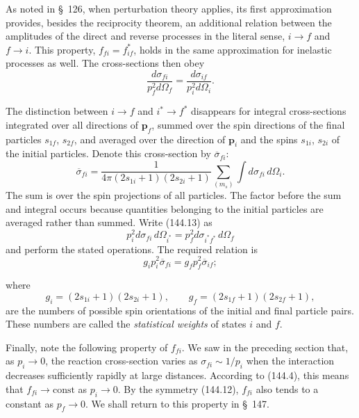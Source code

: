 As noted in \S~126, when perturbation theory applies, its first approximation
provides, besides the reciprocity theorem, an additional relation between the
amplitudes of the direct and reverse processes in the literal sense,
$i\to f$ and $f\to i$. This property, $f_{fi}=f_{if}^*$, holds in the same
approximation for inelastic processes as well. The cross-sections then obey
\begin{equation}
 \frac{d\sigma_{fi}}{p_f^2d\Omega_f}
 =\frac{d\sigma_{if}}{p_i^2d\Omega_i}.
 \tag{144.14}
\end{equation}

The distinction between $i\to f$ and $i^*\to f^*$ disappears for integral
cross-sections integrated over all directions of $\mathbf p_f$, summed over
the spin directions of the final particles $s_{1f}$, $s_{2f}$, and averaged
over the direction of $\mathbf p_i$ and the spins $s_{1i}$, $s_{2i}$ of the
initial particles. Denote this cross-section by $\overline{\sigma}_{fi}$:
\[
 \overline{\sigma}_{fi}=\frac1{4\pi(2s_{1i}+1)(2s_{2i}+1)}
 \sum_{(m_s)}\int d\sigma_{fi}\,d\Omega_i.
\]
The sum is over the spin projections of all particles. The factor before the
sum and integral occurs because quantities belonging to the initial particles
are averaged rather than summed. Write (144.13) as
\[
 p_i^2d\sigma_{fi}\,d\Omega_{i^*}
 =p_f^2d\sigma_{i^*f^*}\,d\Omega_f
\]
and perform the stated operations. The required relation is
\begin{equation}
 g_ip_i^2\overline{\sigma}_{fi}=g_fp_f^2\overline{\sigma}_{if};
 \tag{144.15}
\end{equation}

where
\begin{equation}
 g_i=(2s_{1i}+1)(2s_{2i}+1),\qquad
 g_f=(2s_{1f}+1)(2s_{2f}+1),
 \tag{144.16}
\end{equation}
are the numbers of possible spin orientations of the initial and final
particle pairs. These numbers are called the \emph{statistical weights} of
states $i$ and $f$.

Finally, note the following property of $f_{fi}$. We saw in the preceding
section that, as $p_i\to0$, the reaction cross-section varies as
$\sigma_{fi}\sim1/p_i$ when the interaction decreases sufficiently rapidly
at large distances. According to (144.4), this means that
$f_{fi}\to\mathrm{const}$ as $p_i\to0$. By the symmetry (144.12), $f_{fi}$
also tends to a constant as $p_f\to0$. We shall return to this property in
\S~147.
